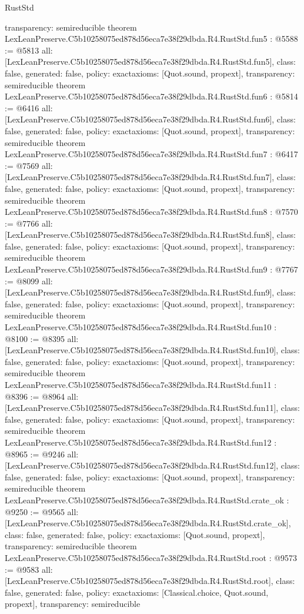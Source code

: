\begin{lexlean}{RustStd}
\begin{coremodule}
{  transparency: semireducible
}
theorem LexLeanPreserve.C5b10258075ed878d56eca7e38f29dbda.R4.RustStd.fun5 : @5588 := @5813 {
  all: [LexLeanPreserve.C5b10258075ed878d56eca7e38f29dbda.R4.RustStd.fun5],
  class: false,
  generated: false,
  policy: exact{axioms: [Quot.sound, propext]},
  transparency: semireducible
}
theorem LexLeanPreserve.C5b10258075ed878d56eca7e38f29dbda.R4.RustStd.fun6 : @5814 := @6416 {
  all: [LexLeanPreserve.C5b10258075ed878d56eca7e38f29dbda.R4.RustStd.fun6],
  class: false,
  generated: false,
  policy: exact{axioms: [Quot.sound, propext]},
  transparency: semireducible
}
theorem LexLeanPreserve.C5b10258075ed878d56eca7e38f29dbda.R4.RustStd.fun7 : @6417 := @7569 {
  all: [LexLeanPreserve.C5b10258075ed878d56eca7e38f29dbda.R4.RustStd.fun7],
  class: false,
  generated: false,
  policy: exact{axioms: [Quot.sound, propext]},
  transparency: semireducible
}
theorem LexLeanPreserve.C5b10258075ed878d56eca7e38f29dbda.R4.RustStd.fun8 : @7570 := @7766 {
  all: [LexLeanPreserve.C5b10258075ed878d56eca7e38f29dbda.R4.RustStd.fun8],
  class: false,
  generated: false,
  policy: exact{axioms: [Quot.sound, propext]},
  transparency: semireducible
}
theorem LexLeanPreserve.C5b10258075ed878d56eca7e38f29dbda.R4.RustStd.fun9 : @7767 := @8099 {
  all: [LexLeanPreserve.C5b10258075ed878d56eca7e38f29dbda.R4.RustStd.fun9],
  class: false,
  generated: false,
  policy: exact{axioms: [Quot.sound, propext]},
  transparency: semireducible
}
theorem LexLeanPreserve.C5b10258075ed878d56eca7e38f29dbda.R4.RustStd.fun10 : @8100 := @8395 {
  all: [LexLeanPreserve.C5b10258075ed878d56eca7e38f29dbda.R4.RustStd.fun10],
  class: false,
  generated: false,
  policy: exact{axioms: [Quot.sound, propext]},
  transparency: semireducible
}
theorem LexLeanPreserve.C5b10258075ed878d56eca7e38f29dbda.R4.RustStd.fun11 : @8396 := @8964 {
  all: [LexLeanPreserve.C5b10258075ed878d56eca7e38f29dbda.R4.RustStd.fun11],
  class: false,
  generated: false,
  policy: exact{axioms: [Quot.sound, propext]},
  transparency: semireducible
}
theorem LexLeanPreserve.C5b10258075ed878d56eca7e38f29dbda.R4.RustStd.fun12 : @8965 := @9246 {
  all: [LexLeanPreserve.C5b10258075ed878d56eca7e38f29dbda.R4.RustStd.fun12],
  class: false,
  generated: false,
  policy: exact{axioms: [Quot.sound, propext]},
  transparency: semireducible
}
theorem LexLeanPreserve.C5b10258075ed878d56eca7e38f29dbda.R4.RustStd.crate_ok : @9250 := @9565 {
  all: [LexLeanPreserve.C5b10258075ed878d56eca7e38f29dbda.R4.RustStd.crate_ok],
  class: false,
  generated: false,
  policy: exact{axioms: [Quot.sound, propext]},
  transparency: semireducible
}
theorem LexLeanPreserve.C5b10258075ed878d56eca7e38f29dbda.R4.RustStd.root : @9573 := @9583 {
  all: [LexLeanPreserve.C5b10258075ed878d56eca7e38f29dbda.R4.RustStd.root],
  class: false,
  generated: false,
  policy: exact{axioms: [Classical.choice, Quot.sound, propext]},
  transparency: semireducible
}


\end{coremodule}
\end{lexlean}
